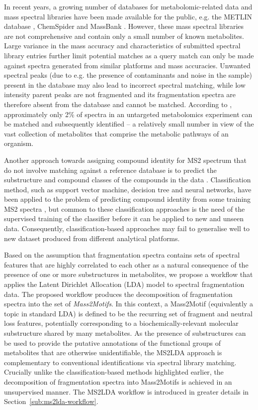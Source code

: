 In recent years, a growing number of databases for metabolomic-related data and mass spectral libraries have been made available for the public, e.g. the METLIN database \cite{Smith2005}, ChemSpider \cite{pence2010chemspider} and MassBank \cite{horai2010massbank}. However, these mass spectral libraries are not comprehensive and contain only a small number of known metabolites. Large variance in the mass accuracy and characteristics of submitted spectral library entries further limit potential matches as a query match can only be made against spectra generated from similar platforms and mass accuracies. Unwanted spectral peaks (due to e.g. the presence of contaminants and noise in the sample) present in the database may also lead to incorrect spectral matching, while low intensity parent peaks are not fragmented and its fragmentation spectra are therefore absent from the database and cannot be matched. According to \cite{DaSilva2015}, approximately only 2\% of spectra in an untargeted metabolomics experiment can be matched and subsequently identified -- a relatively small number in view of the vast collection of metabolites that comprise the metabolic pathways of an organism.

Another approach towards assigning compound identity for MS2 spectrum that do not involve matching against a reference database is to predict the substructure and compound classes of the compounds in the data \cite{Hufsky2014}. Classification method, such as support vector machine, decision tree and neural networks, have been applied to the problem of predicting compound identity from some training MS2 spectra \cite{Varmuza1996,Hummel2010,Heinonen2012a,Duhrkop2015}, but common to these classification approaches is the need of the supervised training of the classifier before it can be applied to new and unseen data. Consequently, classification-based approaches may fail to generalise well to new dataset produced from different analytical platforms. 

Based on the assumption that fragmentation spectra contains sets of spectral features that are highly correlated to each other as a natural consequence of the presence of one or more substructures in metabolites, we propose a workflow that applies the Latent Dirichlet Allocation (LDA) model to spectral fragmentation data. The proposed workflow produces the decomposition of fragmentation spectra into the set of \textit{Mass2Motifs}. In this context, a Mass2Motif (equivalently a topic in standard LDA) is defined to be the recurring set of fragment and neutral loss features, potentially corresponding to a biochemically-relevant molecular substructure shared by many metabolites. As the presence of substructures can be used to provide the putative annotations of the functional groups of metabolites that are otherwise unidentifiable, the MS2LDA approach is complementary to conventional identifications via spectral library matching. Crucially unlike the classification-based methods highlighted earlier, the decomposition of fragmentation spectra into Mass2Motifs is achieved in an unsupervised manner. The MS2LDA workflow is introduced in greater details in Section~\ref{sub:ms2lda-workflow}.

